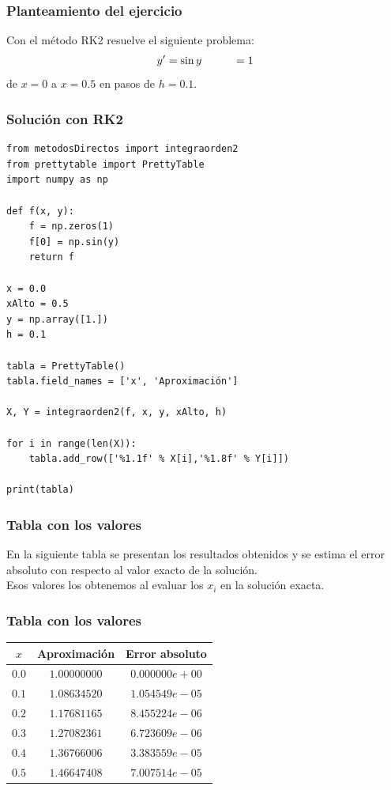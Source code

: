 \documentclass[12pt]{beamer}
\begin{document}
\begin{frame}
\frametitle{Planteamiento del ejercicio}
Con el método RK2 resuelve el siguiente problema:
\pause
\begin{align*}
{y}^{\prime} = \sin y \hspace{1cm} = 1
\end{align*}
de $x = 0$ a $x = 0.5$ en pasos de $h = 0.1$.
\end{frame}
\begin{frame}
\frametitle{Solución con RK2}
\begin{lstlisting}[caption=Código para resolver con RK2 el ejercicio]
from metodosDirectos import integraorden2
from prettytable import PrettyTable
import numpy as np

def f(x, y):
	f = np.zeros(1)
	f[0] = np.sin(y)
	return f

x = 0.0
xAlto = 0.5
y = np.array([1.])
h = 0.1

tabla = PrettyTable()
tabla.field_names = ['x', 'Aproximación']

X, Y = integraorden2(f, x, y, xAlto, h)

for i in range(len(X)):
	tabla.add_row(['%1.1f' % X[i],'%1.8f' % Y[i]])

print(tabla)
\end{lstlisting}
\end{frame}
\begin{frame}
\frametitle{Tabla con los valores}
En la siguiente tabla se presentan los resultados obtenidos y se estima el error absoluto con respecto al valor exacto de la solución.
\\
\bigskip
\pause
Esos valores los obtenemos al evaluar los $x_{i}$ en la solución exacta.
\end{frame}
\begin{frame}
\frametitle{Tabla con los valores}
\begin{table}
\centering
\renewcommand*{\arraystretch}{0.9}
\begin{tabular}{ c c c}
$x$ & Aproximación & Error absoluto \\ \hline
$0.0$ & $1.00000000$ & $0.000000e+00$ \\ \hline
$0.1$ & $1.08634520$ & $1.054549e-05$ \\ \hline
$0.2$ & $1.17681165$ & $8.455224e-06$ \\ \hline
$0.3$ & $1.27082361$ & $6.723609e-06$ \\ \hline
$0.4$ & $1.36766006$ & $3.383559e-05$ \\ \hline
$0.5$ & $1.46647408$ & $7.007514e-05$ \\ \hline
\end{tabular}
\end{table}
\end{frame}
\end{document}
